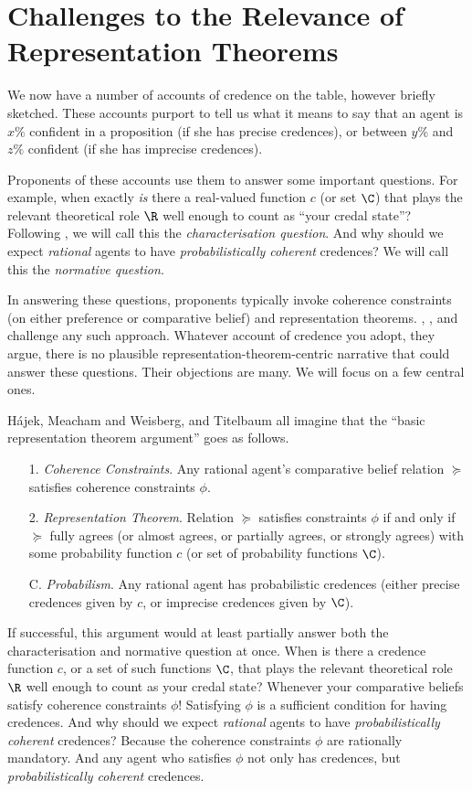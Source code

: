 \section{Challenges to the Relevance of Representation Theorems}\label{konek-sec-4}

We now have a number of accounts of credence on the table, however briefly sketched. These accounts purport to tell us what it means to say that an agent is $x\%$ confident in a proposition (if she has precise credences), or between $y\%$ and $z\%$ confident (if she has imprecise credences).

Proponents of these accounts use them to answer some important questions. For example, when exactly \textit{is} there a real-valued function $c$ (or set $\C$) that plays the relevant theoretical role $\R$ well enough to count as ``your credal state''? Following \citet{Meacham2011}, we will call this the \textit{characterisation question}. And why should we expect \textit{rational} agents to have \textit{probabilistically coherent} credences? We will call this the \textit{normative question}.

In answering these questions, proponents typically invoke coherence constraints (on either preference or comparative belief) and representation theorems. \citet{Hajek2009b}, \citet{Meacham2011}, and \citet{Titelbaum2015} challenge any such approach. Whatever account of credence you adopt, they argue, there is no plausible representation-theorem-centric narrative that could answer these questions. Their objections are many. We will focus on a few central ones.

H\'{a}jek, Meacham and Weisberg, and Titelbaum all imagine that the ``basic representation theorem argument'' goes as follows.
\begin{enumerate}
\item[1.] \textit{Coherence Constraints}. Any rational agent's comparative belief relation $\succeq$ satisfies coherence constraints $\phi$. 
\item[2.] \textit{Representation Theorem}. Relation $\succeq$ satisfies constraints $\phi$ if and only if $\succeq$ fully agrees (or almost agrees, or partially agrees, or strongly agrees) with some probability function $c$ (or set of probability functions $\C$).
\item[C.] \textit{Probabilism}. Any rational agent has probabilistic credences (either precise credences given by $c$, or imprecise credences given by $\C$).
\end{enumerate}
If successful, this argument would at least partially answer both the characterisation and normative question at once. When is there a credence function $c$, or a set of such functions $\C$, that plays the relevant theoretical role $\R$ well enough to count as your credal state? Whenever your comparative beliefs satisfy coherence constraints $\phi$! Satisfying $\phi$ is a sufficient condition for having credences. And why should we expect \textit{rational} agents to have \textit{probabilistically coherent} credences? Because the coherence constraints $\phi$ are rationally mandatory. And any agent who satisfies $\phi$ not only has credences, but \textit{probabilistically coherent} credences.

